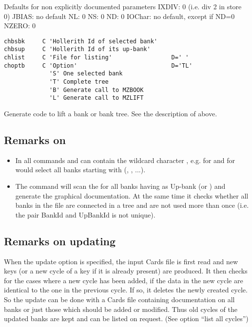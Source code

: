 \begin{XMPt}{Defaults for non explicitly documented parameters}
  IXDIV:  0 (i.e. div 2 in store 0)
  JBIAS:  no default
  NL:     0    NS:     0    ND:     0
  IOChar: no default, except if ND=0
  NZERO:  0
\end{XMPt}
\NODOC{\end{minipage}}
 
\newpage

 
\begin{verbatim}
chbsbk     C 'Hollerith Id of selected bank'
chbsup     C 'Hollerith Id of its up-bank'
chlist     C 'File for listing'                 D=' '
choptb     C 'Option'                           D='TL'
             'S' One selected bank
             'T' Complete tree
             'B' Generate call to MZBOOK
             'L' Generate call to MZLIFT
\end{verbatim}
 
Generate code to lift a bank or bank tree.
See the description of  above.
 
\subsection*{Remarks on }
 
\begin{itemize}
\item In all  commands  and  can contain 
      the wildcard character \Lit{*}, e.g.  for  
      and  for  would select all banks starting
      with  (, , ...). 
\item The command  will scan the \RZfile{}
      for all banks having as Up-bank  (or ) 
      and generate the graphical documentation. 
      At the same time it checks whether all banks in the file are connected 
      in a tree and are not used more than once
      (i.e. the pair BankId  and UpBankId is not unique).
\end{itemize}
 
\subsection*{Remarks on updating}
 
When the update option is specified, the input Cards file is
first read and new keys (or a new cycle of a key if it is already present)
are produced. 
It then checks for the cases where a new cycle has been added, if the data
in the new cycle are identical to the one in the previous cycle.
If so, it deletes the newly created cycle. 
So the update can be done
with a Cards file containing documentation on all banks or just
those which should be added or modified. 
Thus old cycles of the updated banks are kept and can be listed on request.
(See option ``list all cycles'')
 
